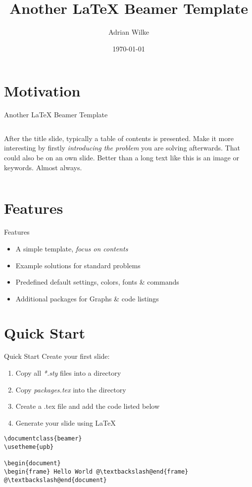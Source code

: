 \documentclass{beamer}
\author[A.~Wilke]{Adrian Wilke}
\institute[]{DICE Group\\Paderborn University}
\title[Another LaTeX Beamer Template]{Another LaTeX Beamer Template}
\subtitle{}
\date{\today}
\begin{document}
{\usebackgroundtemplate{}
\frame[plain]{\titlepage}}
\addtocounter{framenumber}{-1}

\section{Motivation}

\begin{frame}{Another LaTeX Beamer Template}
	\begin{columns}[T]
		After the title slide, typically a table of contents is presented. Make it more interesting by firstly \emph{introducing the problem} you are solving afterwards. That could also be on an own slide. Better than a long text like this is an image or keywords. Almost always.
		\vspace*{.2cm}
		\hypersetup{linkcolor=textblue}
		\tableofcontents
	\end{columns}
\end{frame}

\section{Features}
\begin{frame}{Features}
	\begin{itemize}
		\item A simple template, \emph{focus on contents}
		\item Example solutions for standard problems
		\item Predefined default settings, colors, fonts \&  commands
		\item Additional packages for Graphs \& code listings
	\end{itemize}
\end{frame}

\section{Quick Start}
\begin{frame}[fragile]{Quick Start}
	Create your first slide:
	\begin{enumerate}
		\item Copy all \emph{*.sty} files into a directory
		\item Copy \emph{packages.tex} into the directory
		\item Create a .tex file and add the code listed below
		\item Generate your slide using LaTeX
	\end{enumerate}
	\begin{lstlisting}[caption={Minimal Example}]
\documentclass{beamer}
\usetheme{upb}

\begin{document}
\begin{frame} Hello World @\textbackslash@end{frame}
@\textbackslash@end{document}
	\end{lstlisting}
\end{frame}
\end{document}
